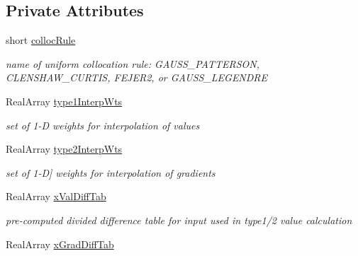 \subsection*{Private Attributes}
\begin{DoxyCompactItemize}
\item 
short \hyperlink{classPecos_1_1HermiteInterpPolynomial_abcc1d84cc8e8c8b5a66f720067039f2e}{colloc\+Rule}\label{classPecos_1_1HermiteInterpPolynomial_abcc1d84cc8e8c8b5a66f720067039f2e}

\begin{DoxyCompactList}\small\item\em name of uniform collocation rule\+: G\+A\+U\+S\+S\+\_\+\+P\+A\+T\+T\+E\+R\+S\+ON, C\+L\+E\+N\+S\+H\+A\+W\+\_\+\+C\+U\+R\+T\+IS, F\+E\+J\+E\+R2, or G\+A\+U\+S\+S\+\_\+\+L\+E\+G\+E\+N\+D\+RE \end{DoxyCompactList}\item 
Real\+Array \hyperlink{classPecos_1_1HermiteInterpPolynomial_a142635e1a0334e06cc17969f45121833}{type1\+Interp\+Wts}\label{classPecos_1_1HermiteInterpPolynomial_a142635e1a0334e06cc17969f45121833}

\begin{DoxyCompactList}\small\item\em set of 1-\/D weights for interpolation of values \end{DoxyCompactList}\item 
Real\+Array \hyperlink{classPecos_1_1HermiteInterpPolynomial_ae041c3717fb8258280964d7a37b2378c}{type2\+Interp\+Wts}\label{classPecos_1_1HermiteInterpPolynomial_ae041c3717fb8258280964d7a37b2378c}

\begin{DoxyCompactList}\small\item\em set of 1-\/D\mbox{]} weights for interpolation of gradients \end{DoxyCompactList}\item 
Real\+Array \hyperlink{classPecos_1_1HermiteInterpPolynomial_a7f82b2b501204c95f0e38508b8e9c2e8}{x\+Val\+Diff\+Tab}\label{classPecos_1_1HermiteInterpPolynomial_a7f82b2b501204c95f0e38508b8e9c2e8}

\begin{DoxyCompactList}\small\item\em pre-\/computed divided difference table for input used in type1/2 value calculation \end{DoxyCompactList}\item 
Real\+Array \hyperlink{classPecos_1_1HermiteInterpPolynomial_a4bf03d251b9dfca347e39d2aaf74e0e9}{x\+Grad\+Diff\+Tab}\label{classPecos_1_1HermiteInterpPolynomial_a4bf03d251b9dfca347e39d2aaf74e0e9}


\end{DoxyCompactItemize}
